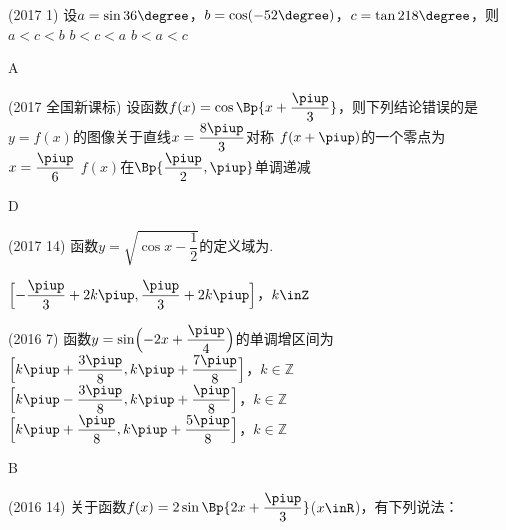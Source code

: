     \begin{exercise}
      \item%
        (2017  1)
        设$a=\sin36\degree$，$b=\cos(-52\degree)$，$c=\tan218\degree$，则\xz
         {$a<c<b$}
         {$b<c<a$}
         {$b<a<c$}
        \begin{answer}
          A
        \end{answer}
      \item%
          {\kaishu (2017 \textbullet 全国新课标)}
          设函数$f(x)=\cos\Bp{x+\dfrac{\piup}3}$，则下列结论错误的是\xz
           {$y=f(x)$的图像关于直线$x=\dfrac{8\piup}3$对称}
           {$f(x+\piup)$的一个零点为$x=\dfrac{\piup}6$}
           {$f(x)$在$\Bp{\dfrac{\piup}2,\piup}$单调递减}
          \begin{answer}
            D
          \end{answer}
      \item%
        (2017  14)
        函数$y=\sqrt{\cos x-\dfrac12}$的定义域为\tk.
        \begin{answer}
          $\Bigl[-\dfrac{\piup}3+2k\piup,\dfrac{\piup}3+2k\piup\Bigr]$，$k\inZ$
        \end{answer}
      \item%
        (2016  7)
        函数$y=\sin\Bigl(-2x+\dfrac{\piup}4 \Bigr)$的单调增区间为\xz
         {$\Bigl[k\piup+\dfrac{3\piup}8,k\piup+\dfrac{7\piup}8 \Bigr]$，$k\in\mathbb{Z}$}
         {$\Bigl[k\piup-\dfrac{3\piup}8,k\piup+\dfrac{\piup}8 \Bigr]$，$k\in\mathbb{Z}$}
         {$\Bigl[k\piup+\dfrac{\piup}8,k\piup+\dfrac{5\piup}8 \Bigr]$，$k\in\mathbb{Z}$}
        \begin{answer}
          B
        \end{answer}
      \item%
        (2016  14)
        关于函数$f(x)=2\sin\Bp{2x+\dfrac{\piup}3}$($x\inR$)，有下列说法：\\

\end{exercise}
